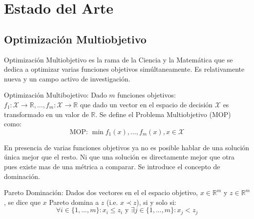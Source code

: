 
\chapter{Estado del Arte}\label{chapter:state-of-the-art}

\section{Optimizaci\'on Multiobjetivo}

Optimizaci\'on Multiobjetivo es la rama de la Ciencia y la Matem\'atica que se dedica a optimizar varias funciones objetivos sim\'ultaneamente. Es relativamente nueva y un campo activo de investigaci\'on.
 
\begin{definition}{Optimizaci\'on Multibojetivo:}
     Dado $m$ funciones objetivos: $f_1: \mathcal{X} \rightarrow \mathbb{R}, ..., f_m: \mathcal{X} \rightarrow \mathbb{R}$ que dado un vector en el espacio de decisi\'on $\mathcal{X}$ es transformado en un valor de $\mathbb{R}$. Se define el Problema Multiobjetivo (MOP) como:
    \begin{equation*}
        \text{MOP: }\min f_1(x), ..., f_m(x), x \in \mathcal{X}
    \end{equation*}
\end{definition}

En presencia de varias funciones objetivos ya no es posible hablar de una soluci\'on \'unica mejor que el resto. Ni que una soluci\'on es directamente mejor que otra pues existe mas de una m\'etrica a comparar. Se introduce el concepto de dominaci\'on.

\begin{definition}{Pareto Dominaci\'on:}
    Dados dos vectores en el el espacio objetivo, $x \in \mathbb{R}^m$ y $z \in \mathbb{R}^m$, se dice que $x$ Pareto domina a $z$ (i.e. $x \prec z$), si y solo si:
    \begin{equation*}
        \forall i \in \{1, ..., m\}: x_i \leq z_i \text{ y } \exists j \in \{1, ..., m\}: x_j < z_j
    \end{equation*}
\end{definition}



